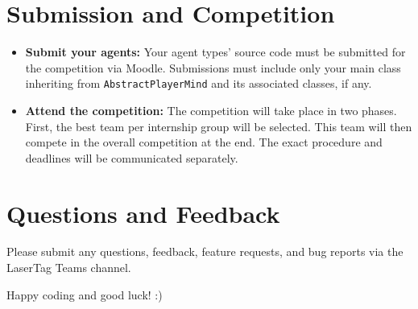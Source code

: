 \documentclass[
    a4paper,
    english,
    DIV=16,
    11pt,
    parskip=half,
]{scrartcl}
\begin{document}
\section*{Submission and Competition}

\begin{itemize}
  \item \textbf{Submit your agents:} Your agent types' source code must be submitted for the competition via Moodle. Submissions must include only your main class inheriting from \texttt{AbstractPlayerMind} and its associated classes, if any.
  \item \textbf{Attend the competition:} The competition will take place in two phases. First, the best team per internship group will be selected. This team will then compete in the overall competition at the end. The exact procedure and deadlines will be communicated separately.
\end{itemize}

\section*{Questions and Feedback}
Please submit any questions, feedback, feature requests, and bug reports via the LaserTag Teams channel.

Happy coding and good luck! :)

\end{document}
